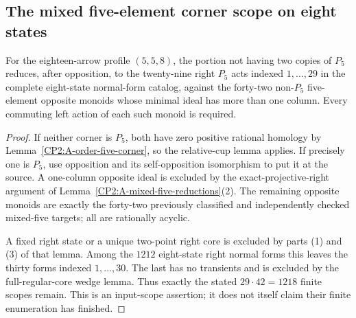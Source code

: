 \subsection{The mixed five-element corner scope on eight states}

\begin{proposition}
\label{CP2:A-P5-mixed-eight-scope}
For the eighteen-arrow profile $(5,5,8)$, the portion not
having two copies of $P_5$ reduces, after opposition, to
the twenty-nine right $P_5$ acts indexed $1,\ldots,29$
in the complete eight-state normal-form catalog, against
the forty-two non-$P_5$ five-element opposite monoids
whose minimal ideal has more than one column.
Every commuting left action of each such monoid is required.
\end{proposition}
\begin{proof}
If neither corner is $P_5$, both have zero positive rational
homology by Lemma~\ref{CP2:A-order-five-corner}, so the
relative-cup lemma applies. If precisely one is $P_5$,
use opposition and its self-opposition isomorphism to put
it at the source. A one-column opposite ideal is excluded
by the exact-projective-right argument of
Lemma~\ref{CP2:A-mixed-five-reductions}(2).
The remaining opposite monoids are exactly the forty-two
previously classified and independently checked mixed-five
targets; all are rationally acyclic.

A fixed right state or a unique two-point right core is
excluded by parts (1) and (3) of that lemma. Among the
$1212$ eight-state right normal forms this leaves the
thirty forms indexed $1,\ldots,30$. The last has no
transients and is excluded by the full-regular-core wedge
lemma. Thus exactly the stated $29\cdot42=1218$ finite
scopes remain. This is an input-scope assertion; it does
not itself claim their finite enumeration has finished.
\end{proof}
